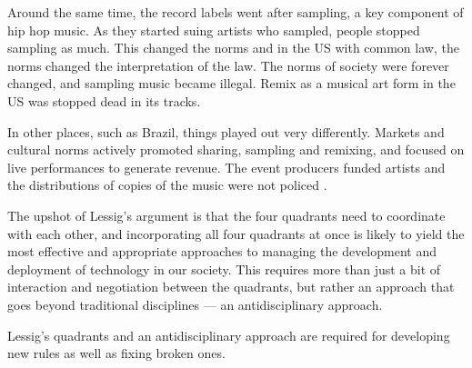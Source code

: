 Around the same time, the record labels went after sampling, a key component of hip hop music. As they started suing artists who sampled, people stopped sampling as much. This changed the norms and in the US with common law, the norms changed the interpretation of the law. The norms of society were forever changed, and sampling music became illegal. Remix as a musical art form in the US was stopped dead in its tracks.

In other places, such as Brazil, things played out very differently. Markets and cultural norms actively promoted sharing, sampling and remixing, and focused on live performances to generate revenue. The event producers funded artists and the distributions of copies of the music were not policed \cite{shaver2010access}.

The upshot of Lessig's argument is that the four quadrants need to coordinate with each other, and incorporating all four quadrants at once is likely to yield the most effective and appropriate approaches to managing the development and deployment of technology in our society. This requires more than just a bit of interaction and negotiation between the quadrants, but rather an approach that goes beyond traditional disciplines --- an antidisciplinary approach.

Lessig's quadrants and an antidisciplinary approach are required for developing new rules as well as fixing broken ones.

